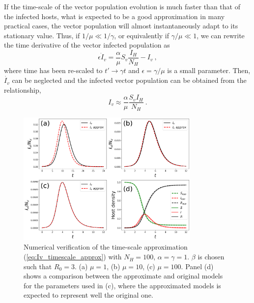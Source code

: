 If the time-scale of the vector population evolution is much faster than
that of the infected hosts, what is expected to be a good approximation in many
practical cases, the vector population will almost instantaneously adapt to its
stationary value. Thus, if $1/\mu\ll1/\gamma$, or equivalently if
$\gamma/\mu\ll1$, we can rewrite the time derivative of the vector infected
population as
\begin{equation}
    \epsilon\dot{I}_v=\frac{\alpha}{\mu}S_v\frac{I_H}{N_H} - I_v \ ,
\end{equation}
where time has been re-scaled to $t'\to\gamma t$ and $\epsilon=\gamma/\mu$
is a small parameter. Then, $\dot{I_v}$ can be neglected and the infected
vector population can be obtained from the relationship,
\begin{equation}\label{eq:Iv_timescale_approx}
    I_v\approx\frac{\alpha}{\mu}\frac{S_v I_H}{N_H} \ .
\end{equation}

\begin{figure}[H]
    \centering
    \includegraphics[width=0.8\textwidth]{Figures/Timescale_approx.pdf}
    \caption[Numerical verification of the time-scale approximation]{Numerical
        verification of the time-scale approximation
        (\cref{eq:Iv_timescale_approx}) with $N_H=100$, $\alpha=\gamma=1$.
        $\beta$ is
        chosen such that $R_0=3$. (a) $\mu=1$, (b) $\mu=10$, (c) $\mu=100$.
        Panel (d)
        shows a comparison between the approximate and original models for the
        parameters used in (c), where the approximated models is expected to
        represent
        well the original one.}
    \label{fig:timescale_approx}
\end{figure}

